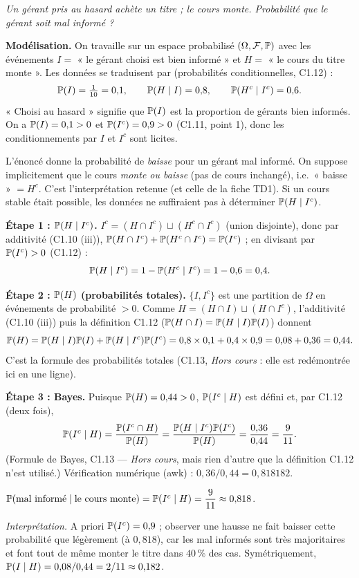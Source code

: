 \documentclass[11pt,a4paper]{article}
\begin{document}
\begin{exo}
\emph{Un gérant pris au hasard achète un titre ; le cours monte. Probabilité que le gérant soit mal informé ?}

\textbf{Modélisation.} On travaille sur un espace probabilisé $(\Omega,\mathcal{F},\mathbb{P})$ avec les événements
$I=$ « le gérant choisi est bien informé » et $H=$ « le cours du titre monte ». Les données se traduisent par
(probabilités conditionnelles, C1.12) :
\[\mathbb{P}(I)=\tfrac1{10}=0{,}1,\qquad \mathbb{P}(H\mid I)=0{,}8,\qquad \mathbb{P}(H^c\mid I^c)=0{,}6.\]
« Choisi au hasard » signifie que $\mathbb{P}(I)$ est la proportion de gérants bien informés. On a $\mathbb{P}(I)=0{,}1>0$ et $\mathbb{P}(I^c)=0{,}9>0$
(C1.11, point 1), donc les conditionnements par $I$ et $I^c$ sont licites.

\begin{alerte}
L'énoncé donne la probabilité de \emph{baisse} pour un gérant mal informé. On suppose implicitement que le cours
\emph{monte ou baisse} (pas de cours inchangé), i.e.\ « baisse » $=H^c$. C'est l'interprétation retenue (et celle de la fiche TD1).
Si un cours stable était possible, les données ne suffiraient pas à déterminer $\mathbb{P}(H\mid I^c)$.
\end{alerte}

\textbf{Étape 1 : $\mathbb{P}(H\mid I^c)$.} $I^c=(H\cap I^c)\sqcup(H^c\cap I^c)$ (union disjointe), donc par additivité (C1.10 (iii)),
$\mathbb{P}(H\cap I^c)+\mathbb{P}(H^c\cap I^c)=\mathbb{P}(I^c)$ ; en divisant par $\mathbb{P}(I^c)>0$ (C1.12) :
\[\mathbb{P}(H\mid I^c)=1-\mathbb{P}(H^c\mid I^c)=1-0{,}6=0{,}4.\]

\textbf{Étape 2 : $\mathbb{P}(H)$ (probabilités totales).} $\{I,I^c\}$ est une partition de $\Omega$ en événements de probabilité $>0$.
Comme $H=(H\cap I)\sqcup(H\cap I^c)$, l'additivité (C1.10 (iii)) puis la définition C1.12 ($\mathbb{P}(H\cap I)=\mathbb{P}(H\mid I)\mathbb{P}(I)$) donnent
\[\mathbb{P}(H)=\mathbb{P}(H\mid I)\mathbb{P}(I)+\mathbb{P}(H\mid I^c)\mathbb{P}(I^c)=0{,}8\times0{,}1+0{,}4\times0{,}9=0{,}08+0{,}36=0{,}44.\]
C'est la formule des probabilités totales (C1.13, \emph{Hors cours} : elle est redémontrée ici en une ligne).

\textbf{Étape 3 : Bayes.} Puisque $\mathbb{P}(H)=0{,}44>0$, $\mathbb{P}(I^c\mid H)$ est défini et, par C1.12 (deux fois),
\[\mathbb{P}(I^c\mid H)=\frac{\mathbb{P}(I^c\cap H)}{\mathbb{P}(H)}=\frac{\mathbb{P}(H\mid I^c)\mathbb{P}(I^c)}{\mathbb{P}(H)}=\frac{0{,}36}{0{,}44}=\frac{9}{11}.\]
(Formule de Bayes, C1.13 — \emph{Hors cours}, mais rien d'autre que la définition C1.12 n'est utilisé.)
Vérification numérique (awk) : $0{,}36/0{,}44=0{,}818182$.
\begin{resultat}
$\mathbb{P}(\text{mal informé}\mid\text{le cours monte})=\mathbb{P}(I^c\mid H)=\dfrac{9}{11}\approx0{,}818$.
\end{resultat}
\textit{Interprétation.} A priori $\mathbb{P}(I^c)=0{,}9$ ; observer une hausse ne fait baisser cette probabilité que légèrement (à $0{,}818$),
car les mal informés sont très majoritaires et font tout de même monter le titre dans $40\,\%$ des cas.
Symétriquement, $\mathbb{P}(I\mid H)=0{,}08/0{,}44=2/11\approx0{,}182$.
\end{exo}
\end{document}

